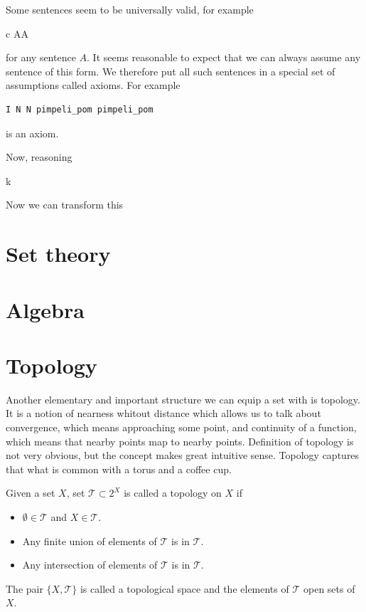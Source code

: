 \documentclass[11pt,oneside,%
]{memoir}
\newenvironment{eqna}{\begin{IEEEeqnarray}{c}}{\end{IEEEeqnarray}\ignorespacesafterend}
\theoremstyle{definition}
\begin{document}
Some sentences seem to be universally valid, for example
\begin{eqna}
    \neg\neg A\rightarrow A
\end{eqna} for any sentence \(A\). It seems reasonable to expect that we can always assume any sentence of this form. We therefore put all such sentences in a special set of assumptions called axioms. For example
\begin{lstlisting}[language=propositio]
I N N pimpeli_pom pimpeli_pom
\end{lstlisting}
is an axiom.



Now, reasoning 


k

Now we can transform this 























\section{Set theory}

\section{Algebra}

\section{Topology}

Another elementary and important structure we can equip a set with is topology. It is a notion of nearness whitout distance which allows us to talk about convergence, which means approaching some point, and continuity of a function, which means that nearby points map to nearby points. Definition of topology is not very obvious, but the concept makes great intuitive sense. Topology captures that what is common with a torus and a coffee cup.

Given a set \(X\), set \(\mathcal{T}\subset2^X\) is called a topology on \(X\) if
\begin{itemize}
    \item \(\emptyset\in\mathcal{T}\) and \(X\in\mathcal{T}\).
    \item Any finite union of elements of \(\mathcal{T}\) is in \(\mathcal{T}\).
    \item Any intersection of elements of \(\mathcal{T}\) is in \(\mathcal{T}\).
\end{itemize}
The pair \(\lbrace X,\mathcal{T}\rbrace\) is called a topological space and the elements of \(\mathcal{T}\) open sets of \(X\).
\end{document}
